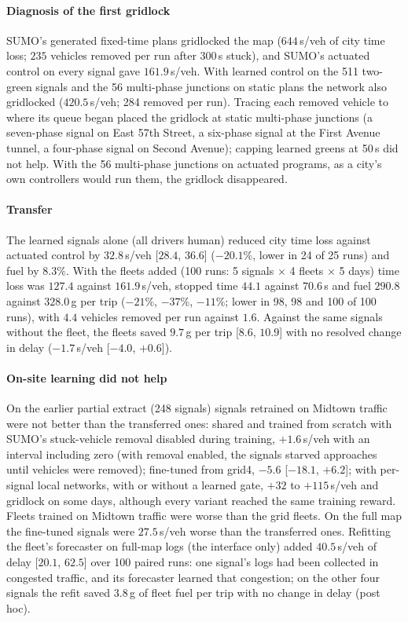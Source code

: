 \paragraph{Diagnosis of the first gridlock} SUMO's generated fixed-time plans gridlocked the map ($644$\,s/veh of city time loss; $235$
vehicles removed per run after 300\,s stuck), and SUMO's actuated control on every signal gave $161.9$\,s/veh. With learned control on the
511 two-green signals and the 56 multi-phase junctions on static plans the network also gridlocked ($420.5$\,s/veh; 284 removed per run).
Tracing each removed vehicle to where its queue began placed the gridlock at static multi-phase junctions (a seven-phase signal on East
57th Street, a six-phase signal at the First Avenue tunnel, a four-phase signal on Second Avenue); capping learned greens at 50\,s did
not help. With the 56 multi-phase junctions on actuated programs, as a city's own controllers would run them, the gridlock disappeared.
\paragraph{Transfer} The learned signals alone (all drivers human) reduced city time loss against actuated control by $32.8$\,s/veh
[$28.4$, $36.6$] ($-20.1\%$, lower in 24 of 25 runs) and fuel by $8.3\%$. With the fleets added (100 runs: 5 signals $\times$ 4 fleets
$\times$ 5 days) time loss was $127.4$ against $161.9$\,s/veh, stopped time $44.1$ against $70.6$\,s and fuel $290.8$ against $328.0$\,g
per trip ($-21\%$, $-37\%$, $-11\%$; lower in 98, 98 and 100 of 100 runs), with $4.4$ vehicles removed per run against $1.6$. Against the
same signals without the fleet, the fleets saved $9.7$\,g per trip [$8.6$, $10.9$] with no resolved change in delay ($-1.7$\,s/veh
[$-4.0$, $+0.6$]).
\paragraph{On-site learning did not help} On the earlier partial extract (248 signals) signals retrained on Midtown traffic were not better
than the transferred ones: shared and trained from scratch with SUMO's stuck-vehicle removal disabled during training, $+1.6$\,s/veh with
an interval including zero (with removal enabled, the signals starved approaches until vehicles were removed); fine-tuned from grid4,
$-5.6$ [$-18.1$, $+6.2$]; with per-signal local networks, with or without a learned gate, $+32$ to $+115$\,s/veh and gridlock on some days,
although every variant reached the same training reward. Fleets trained on Midtown traffic were worse than the grid fleets. On the full
map the fine-tuned signals were $27.5$\,s/veh worse than the transferred ones. Refitting the fleet's forecaster on full-map logs (the
interface only) added $40.5$\,s/veh of delay [$20.1$, $62.5$] over 100 paired runs: one signal's logs had been collected in congested
traffic, and its forecaster learned that congestion; on the other four signals the refit saved $3.8$\,g of fleet fuel per trip with no
change in delay (post hoc).
